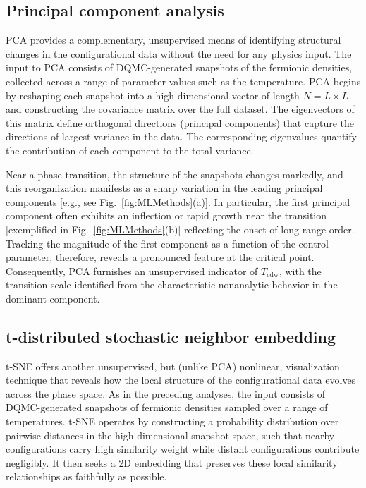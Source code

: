 \documentclass[%
reprint,
superscriptaddress,
nofootinbib,
twocolumn,
amsmath,amssymb,
aps,
prb,
]{revtex4-2}
\begin{document}
\subsection{Principal component analysis}
\gls*{PCA} provides a complementary, unsupervised means of identifying structural changes in the configurational data without the need for any physics input. The input to \gls*{PCA} consists of \gls*{DQMC}-generated snapshots of the fermionic densities, collected across a range of parameter values such as the temperature. \gls*{PCA} begins by reshaping each snapshot into a high-dimensional vector of length $N = L\times L$ and constructing the covariance matrix over the full dataset. The eigenvectors of this matrix define orthogonal directions (principal components) that capture the directions of largest variance in the data. The corresponding eigenvalues quantify the contribution of each component to the total variance.

Near a phase transition, the structure of the snapshots changes markedly, and this reorganization manifests as a sharp variation in the leading principal components [e.g., see Fig.~\ref{fig:MLMethods}(a)]. In particular, the first principal component often exhibits an inflection or rapid growth near the transition [exemplified in Fig.~\ref{fig:MLMethods}(b)] reflecting the onset of long-range order. Tracking the magnitude of the first component as a function of the control parameter, therefore, reveals a pronounced feature at the critical point. Consequently, \gls*{PCA} furnishes an unsupervised indicator of $T_\mathrm{cdw}$, with the transition scale identified from the characteristic nonanalytic behavior in the dominant component.

\subsection{t-distributed stochastic neighbor embedding}
\gls*{t-SNE} offers another unsupervised, but (unlike \gls*{PCA}) nonlinear, visualization technique that reveals how the local structure of the configurational data evolves across the phase space. As in the preceding analyses, the input consists of \gls*{DQMC}-generated snapshots of fermionic densities sampled over a range of temperatures. \gls*{t-SNE} operates by constructing a probability distribution over pairwise distances in the high-dimensional snapshot space, such that nearby configurations carry high similarity weight while distant configurations contribute negligibly. It then seeks a \gls*{2D} embedding that preserves these local similarity relationships as faithfully as possible.
\end{document}
